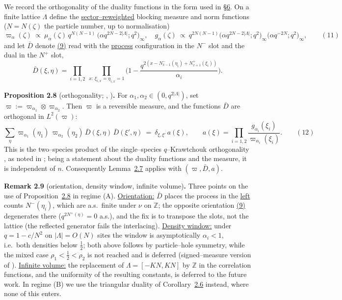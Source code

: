 \documentclass[11pt]{article}
\theoremstyle{plain}
\theoremstyle{definition}
\theoremstyle{remark}
\newcommand{\Z}{\mathbb{Z}}\newcommand{\R}{\mathbb{R}}\newcommand{\N}{\mathbb{N}}
\begin{document}
We record the orthogonality of the duality functions in the form used in
\S\hyperref[sec_ew]{6}. On a finite lattice $\Lambda$ define the \underline{sector--reweighted}
blocking measure and norm functions ($N=N(\zeta)$ the particle number, up to
normalisation)
\label{eq_omegadef}
\begin{equation}
  \varpi_\alpha(\zeta)\ \propto\ \mu_\alpha(\zeta)\,q^{N(N-1)}\,
  \big(\alpha q^{2N-2|\Lambda|};q^2\big)_\infty,\quad
  g_\alpha(\zeta)\ \propto\ q^{2N(N-1)}
  \big(\alpha q^{2N-2|\Lambda|};q^2\big)_\infty\big(\alpha q^{-2N};q^2\big)_\infty,\qquad(11)
\end{equation}
and let $\bar D$ denote \hyperref[eq_Dreu]{(9)} read with the \underline{process} configuration in
the $N^-$ slot and the dual in the $N^+$ slot,
\[
  \bar D(\xi,\eta)=\prod_{i=1,2}\ \prod_{x:\,\xi_{i,x}=\eta_{i,x}=1}
  \Big(1-\frac{q^{2\left(x-N^-_{x-1}(\eta_i)+N^+_{x+1}(\xi_i)\right)}}{\alpha_i}\Big).
\]

\label{prop_orth}\noindent\textbf{Proposition 2.8} (orthogonality; {\cite[Thm.~3.2]{CFG20}}, {\cite[\S3.1]{REU}})\textbf{.} 
For $\alpha_1,\alpha_2\in(0,q^{2|\Lambda|})$, set
$\varpi:=\varpi_{\alpha_1}\otimes\varpi_{\alpha_2}$. Then $\varpi$ is a reversible
measure, and the functions $\bar D$ are orthogonal in $L^2(\varpi)$:
\label{eq_orthexact}
\begin{equation}
  \sum_\eta \varpi_{\alpha_1}(\eta_1)\,\varpi_{\alpha_2}(\eta_2)\,
  \bar D(\xi,\eta)\,\bar D(\xi',\eta)\ =\ \delta_{\xi,\xi'}\,a(\xi),\qquad
  a(\xi)=\prod_{i=1,2}\frac{g_{\alpha_i}(\xi_i)}{\varpi_{\alpha_i}(\xi_i)}.\qquad(12)
\end{equation}
This is the two--species product of the single--species $q$--Krawtchouk orthogonality
\cite[Thm.~3.2]{CFG20}, as noted in \cite[\S3.1]{REU}; being a statement about the
duality functions and the measure, it is independent of $n$. Consequently
Lemma~\hyperref[lem_acr]{2.7} applies with $(\varpi,\bar D,a)$.
\par

\label{rem_orthstatus}\noindent\textbf{Remark 2.9} (orientation, density window, infinite volume)\textbf{.} 
Three points on the use of Proposition~\hyperref[prop_orth]{2.8} in regime (A). \underline{Orientation:}
$\bar D$ places the process in the \underline{left} counts $N^-(\eta_i)$, which are a.s.\
finite under $\nu$ on $\Z$; the opposite orientation \hyperref[eq_Dreu]{(9)} degenerates there
($q^{2N^+(\eta)}=0$ a.s.), and the fix is to transpose the slots, not the lattice (the
reflected generator fails the interlacing). \underline{Density window:} under $q=1-c/N^2$ on
$|\Lambda|=O(N)$ sites the window is asymptotically $\alpha_i<1$, i.e.\ both densities
below $\tfrac12$; both above follows by particle--hole symmetry, while the mixed case
$\rho_1<\tfrac12<\rho_2$ is not reached and is deferred (signed--measure version of
\cite[Thm.~3.2]{CFG20}). \underline{Infinite volume:} the replacement of $\Lambda=[-KN,KN]$
by $\Z$ in the correlation functions, and the uniformity of the resulting constants,
is deferred to the future work. In regime (B) we use the triangular duality of
Corollary~\hyperref[cor_tri]{2.6} instead, where none of this enters.
\par
\end{document}
